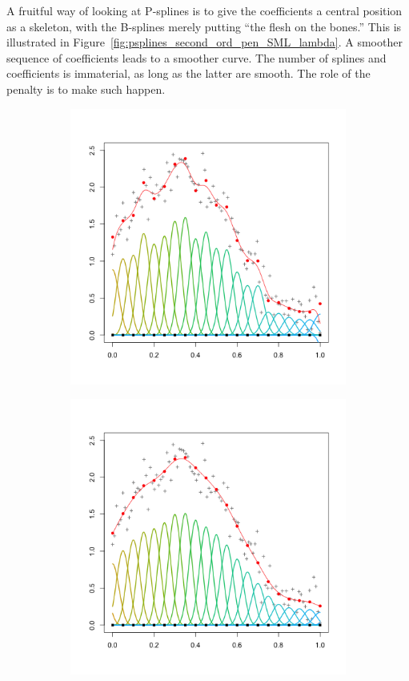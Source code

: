 \documentclass[12pt]{article}
\newcommand*\needsparaphrased{\color{red}}
\begin{document}
{\needsparaphrased A fruitful way of looking at P-splines is to give the coefficients a central position as a skeleton, with the B-splines merely putting ``the flesh on the bones.'' This is illustrated
in Figure~\ref{fig:psplines_second_ord_pen_SML_lambda}. A smoother sequence of coefficients leads to a smoother curve. The number of splines and coefficients is immaterial, as long as the latter are smooth. The role of the
penalty is to make such happen. 

\begin{figure}[H]
\begin{subfigure}{.5\textwidth}
  \centering
   \graphicspath{{img/}}
  \includegraphics[scale=0.5]{pspline_pord2_xsmall_lambda.png}
  \label{fig:pspline_small_lambda}
\end{subfigure}
\begin{subfigure}{.5\textwidth}
  \centering
   \graphicspath{{img/}}
  \includegraphics[scale=0.5]{pspline_pord2_small_lambda.png}

\end{subfigure}
\end{figure}}
\end{document}
